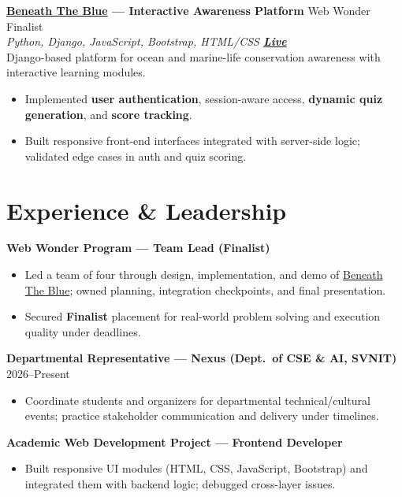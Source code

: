 \documentclass[a4paper,10pt]{article}
\begin{document}
\vspace{0.8mm}
\noindent\textbf{\href{https://beneath-the-blue-1-3c6o.onrender.com/}{Beneath The Blue} --- Interactive Awareness Platform}
\hfill {\small Web Wonder Finalist}\\
\textit{\small Python, Django, JavaScript, Bootstrap, HTML/CSS \textbar{}
\href{https://beneath-the-blue-1-3c6o.onrender.com/}{\textbf{Live}}}\\[0.4mm]
Django-based platform for ocean and marine-life conservation awareness with interactive learning modules.
\begin{itemize}
  \item Implemented \textbf{user authentication}, session-aware access, \textbf{dynamic quiz generation}, and \textbf{score tracking}.
  \item Built responsive front-end interfaces integrated with server-side logic; validated edge cases in auth and quiz scoring.
\end{itemize}

\section{Experience \& Leadership}
\vspace{0.55mm}
\noindent\textbf{Web Wonder Program --- Team Lead (Finalist)}
\begin{itemize}
  \item Led a team of four through design, implementation, and demo of \href{https://beneath-the-blue-1-3c6o.onrender.com/}{Beneath The Blue}; owned planning, integration checkpoints, and final presentation.
  \item Secured \textbf{Finalist} placement for real-world problem solving and execution quality under deadlines.
\end{itemize}

\vspace{0.7mm}
\noindent\textbf{Departmental Representative --- Nexus (Dept.\ of CSE \& AI, SVNIT)} \hfill {\small 2026--Present}
\begin{itemize}
  \item Coordinate students and organizers for departmental technical/cultural events; practice stakeholder communication and delivery under timelines.
\end{itemize}

\vspace{0.7mm}
\noindent\textbf{Academic Web Development Project --- Frontend Developer}
\begin{itemize}
  \item Built responsive UI modules (HTML, CSS, JavaScript, Bootstrap) and integrated them with backend logic; debugged cross-layer issues.
\end{itemize}
\end{document}

